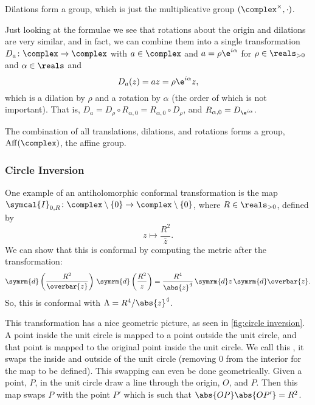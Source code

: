 \documentclass[fleqn]{NotesClass}
\renewcommand{\dd}[1]{\,\symrm{d}#1}
\renewcommand{\dl}[1]{\symrm{d}#1}
\DeclareMathOperator{\Aff}{Aff}
\newcommand{\inversion}{\symcal{I}}
\begin{document}
    Dilations form a group, which is just the multiplicative group \((\complex^{\times}, \cdot)\).
    
    Just looking at the formulae we see that rotations about the origin and dilations are very similar, and in fact, we can combine them into a single transformation \(D_a \colon \complex \to \complex\) with \(a \in \complex\) and \(a = \rho \e^{i\alpha}\) for \(\rho \in \reals_{>0}\) and \(\alpha \in \reals\) and
    \begin{equation}
        D_a(z) = az = \rho \e^{i\alpha} z,
    \end{equation}
    which is a dilation by \(\rho\) and a rotation by \(\alpha\) (the order of which is not important).
    That is, \(D_a = D_\rho \circ R_{\alpha, 0} = R_{\alpha, 0} \circ D_\rho\), and \(R_{\alpha, 0} = D_{\e^{i\alpha}}\).
    
    The combination of all translations, dilations, and rotations forms a group, \(\Aff(\complex)\), the affine group.
    
    \subsubsection{Circle Inversion}
    One example of an antiholomorphic conformal transformation is the map \(\inversion_{0,R} \colon \complex\setminus\{0\} \to \complex\setminus\{0\}\), where \(R \in \reals_{>0}\), defined by
    \begin{equation}
        z \mapsto \frac{R^2}{\overbar{z}}.
    \end{equation}
    We can show that this is conformal by computing the metric after the transformation:
    \begin{equation}
        \dl{\left( \frac{R^2}{\overbar{z}} \right)} \dd{\left( \frac{R^2}{z} \right)} = \frac{R^4}{\abs{z}^4} \dd{z} \dd{\overbar{z}}.
    \end{equation}
    So, this is conformal with \(\Lambda = R^4/\abs{z}^4\).
    
    This transformation has a nice geometric picture, as seen in \cref{fig:circle inversion}.
    A point inside the unit circle is mapped to a point outside the unit circle, and that point is mapped to the original point inside the unit circle.
    We call this , it swaps the inside and outside of the unit circle (removing 0 from the interior for the map to be defined).
    This swapping can even be done geometrically.
    Given a point, \(P\), in the unit circle draw a line through the origin, \(O\), and \(P\).
    Then this map swaps \(P\) with the point \(P'\) which is such that \(\abs{OP}\abs{OP'} = R^2\).
    
\end{document}
